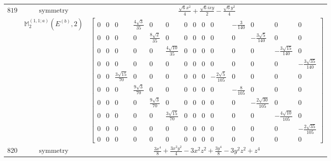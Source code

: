 \documentclass[fleqn,8pt,landscape]{jsarticle}
\begin{document}
\begin{longtable}{ccc}
$ 819 $ & $ \text{symmetry} $ & $ \frac{\sqrt{6} x^{2}}{4} + \frac{\sqrt{6} i x y}{2} - \frac{\sqrt{6} y^{2}}{4} $ \\
$  $ & $ \mathbb{M}_{2}^{(1,1;a)}(E^{(b)},2) $ & $ \begin{bmatrix} 0 & 0 & 0 & \frac{4 \sqrt{3}}{35} & 0 & 0 & 0 & 0 & 0 & 0 & - \frac{3}{140} & 0 & 0 & 0 \\ 0 & 0 & 0 & 0 & \frac{8 \sqrt{2}}{35} & 0 & 0 & 0 & 0 & 0 & 0 & - \frac{3 \sqrt{5}}{140} & 0 & 0 \\ 0 & 0 & 0 & 0 & 0 & \frac{4 \sqrt{10}}{35} & 0 & 0 & 0 & 0 & 0 & 0 & - \frac{3 \sqrt{15}}{140} & 0 \\ 0 & 0 & 0 & 0 & 0 & 0 & 0 & 0 & 0 & 0 & 0 & 0 & 0 & - \frac{3 \sqrt{35}}{140} \\ 0 & 0 & \frac{3 \sqrt{15}}{70} & 0 & 0 & 0 & 0 & 0 & 0 & - \frac{2 \sqrt{5}}{105} & 0 & 0 & 0 & 0 \\ 0 & 0 & 0 & \frac{9 \sqrt{3}}{70} & 0 & 0 & 0 & 0 & 0 & 0 & - \frac{8}{105} & 0 & 0 & 0 \\ 0 & 0 & 0 & 0 & \frac{9 \sqrt{3}}{70} & 0 & 0 & 0 & 0 & 0 & 0 & - \frac{2 \sqrt{30}}{105} & 0 & 0 \\ 0 & 0 & 0 & 0 & 0 & \frac{3 \sqrt{15}}{70} & 0 & 0 & 0 & 0 & 0 & 0 & - \frac{4 \sqrt{10}}{105} & 0 \\ 0 & 0 & 0 & 0 & 0 & 0 & 0 & 0 & 0 & 0 & 0 & 0 & 0 & - \frac{2 \sqrt{35}}{105} \\ 0 & 0 & 0 & 0 & 0 & 0 & 0 & 0 & 0 & 0 & 0 & 0 & 0 & 0 \end{bmatrix} $ \\ \hline
$ 820 $ & $ \text{symmetry} $ & $ \frac{3 x^{4}}{8} + \frac{3 x^{2} y^{2}}{4} - 3 x^{2} z^{2} + \frac{3 y^{4}}{8} - 3 y^{2} z^{2} + z^{4} $ \\

\end{longtable}
\end{document}
